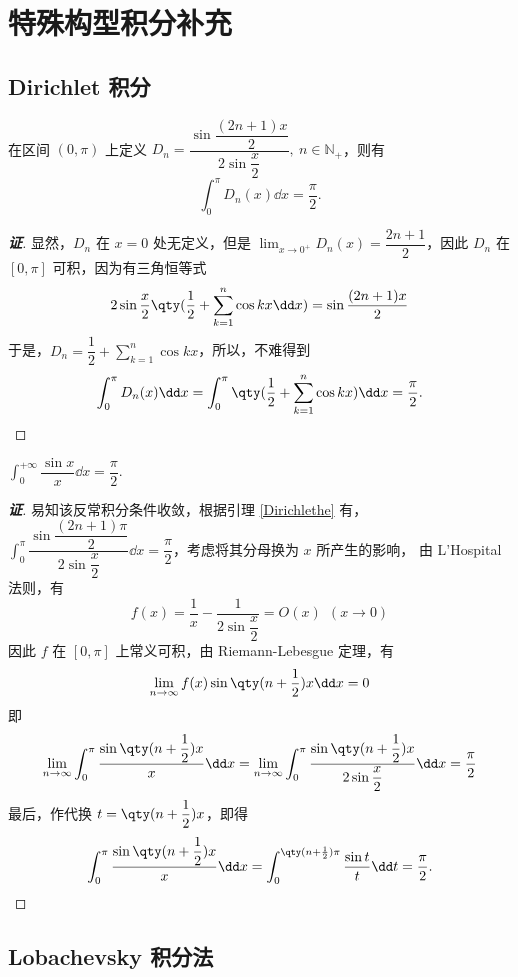 \section{特殊构型积分补充}

\subsection{Dirichlet 积分}

\begin{lemma}[Dirichlet 核]
    \label{Dirichlethe}
    在区间 $(0,\pi)$ 上定义 $D_n=\dfrac{\sin\dfrac{(2n+1)x}{2}}{2\sin\dfrac{x}{2}},~n\in\mathbb{N}_+$，则有 $$\int_{0}^{\pi}D_n(x)\dd x=\dfrac{\pi}{2}.$$
\end{lemma}
\begin{proof}[{\songti \textbf{证}}]
    显然，$D_n$ 在 $x=0$ 处无定义，但是 $\displaystyle\lim_{x\to0^+}D_n(x)=\dfrac{2n+1}{2}$，因此 $D_n$ 在 $[0,\pi]$ 可积，因为有三角恒等式
    $$2\sin\dfrac{x}{2}\qty(\dfrac{1}{2}+\sum_{k=1}^{n}\cos kx\dd x)=\sin\dfrac{(2n+1)x}{2}$$
    于是，$\displaystyle D_n=\dfrac{1}{2}+\sum_{k=1}^{n}\cos kx$，所以，不难得到
    $$\int_{0}^{\pi}D_n(x)\dd x=\int_{0}^{\pi}\qty(\dfrac{1}{2}+\sum_{k=1}^{n}\cos kx)\dd x=\dfrac{\pi}{2}.$$
\end{proof}

\begin{theorem}
    $\displaystyle\int_{0}^{+\infty}\dfrac{\sin x}{x}\dd x=\dfrac{\pi}{2}.$
\end{theorem}
\begin{proof}[{\songti \textbf{证}}]
    易知该反常积分条件收敛，根据引理 \ref{Dirichlethe} 有，$\displaystyle\int_{0}^{\pi}\dfrac{\sin\dfrac{(2n+1)\pi}{2}}{2\sin\dfrac{x}{2}}\dd x=\dfrac{\pi}{2}$，考虑将其分母换为 $x$ 所产生的影响，
    由 L'Hospital 法则，有 $$f(x)=\dfrac{1}{x}-\dfrac{1}{2\sin\dfrac{x}{2}}=O(x)~~ (x\to0)$$
    因此 $f$ 在 $[0,\pi]$ 上常义可积，由 Riemann-Lebesgue 定理，有
    $$\lim_{n\to\infty}f(x)\sin\qty(n+\dfrac{1}{2})x\dd x=0$$
    即 $$\lim_{n\to\infty}\int_{0}^{\pi}\dfrac{\sin\qty(n+\dfrac{1}{2})x}{x}\dd x=\lim_{n\to\infty}\int_{0}^{\pi}\dfrac{\sin\qty(n+\dfrac{1}{2})x}{2\sin\dfrac{x}{2}}\dd x=\dfrac{\pi}{2}$$
    最后，作代换 $t=\qty(n+\dfrac{1}{2})x$，即得 $$\int_{0}^{\pi}\dfrac{\sin\qty(n+\dfrac{1}{2})x}{x}\dd x=\int_{0}^{\qty(n+\frac{1}{2})\pi}\dfrac{\sin t}{t}\dd t=\dfrac{\pi}{2}.$$
\end{proof}

\subsection{Lobachevsky 积分法}

